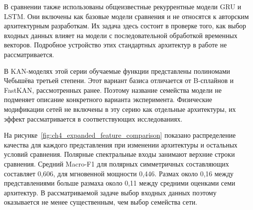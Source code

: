 {}

В сравнении также использованы общеизвестные
рекуррентные модели GRU и LSTM. Они включены как базовые
модели сравнения и не относятся к авторским архитектурным
разработкам. Их задача здесь состоит в проверке того,
как выбор входных данных влияет на модели с последовательной
обработкой временных векторов. Подробное устройство
этих стандартных архитектур в работе не рассматривается.

В KAN-моделях этой серии обучаемые функции представлены
полиномами Чебышёва третьей степени.
Этот вариант базиса отличается от B-сплайнов и FastKAN,
рассмотренных ранее. Поэтому название семейства модели
не подменяет описание конкретного варианта эксперимента.
Физические модификации сетей не включены в эту серию
как отдельные архитектуры, их эффект рассматривается
в соответствующих исследованиях.

На рисунке~\ref{fig:ch4_expanded_feature_comparison}
показано распределение качества для каждого представления
при изменении архитектуры и остальных условий сравнения. Полярные спектральные входы занимают
верхние строки сравнения. Средний Macro-F1 для полярных
симметричных составляющих составляет 0,606,
для мгновенной мощности 0,446.
Размах около 0,16 между представлениями больше размаха
около 0,11 между средними оценками семи архитектур.
В рассматриваемой задаче выбор входных данных поэтому
оказывается не менее существенным, чем выбор семейства сети.

